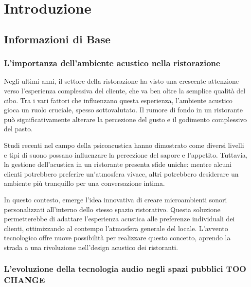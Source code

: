 
%

\chapter{Introduzione}
\label{cha:introduzione}


\section{Informazioni di Base}

\subsection{L'importanza dell'ambiente acustico nella ristorazione}
\noindent

Negli ultimi anni, il settore della ristorazione ha visto una crescente attenzione verso l'esperienza complessiva del cliente, che va ben oltre la semplice qualità del cibo. Tra i vari fattori che influenzano questa esperienza, l'ambiente acustico gioca un ruolo cruciale, spesso sottovalutato. Il rumore di fondo in un ristorante può significativamente alterare la percezione del gusto e il godimento complessivo del pasto.

Studi recenti nel campo della psicoacustica hanno dimostrato come diversi livelli e tipi di suono possano influenzare la percezione del sapore e l'appetito. Tuttavia, la gestione dell'acustica in un ristorante presenta sfide uniche: mentre alcuni clienti potrebbero preferire un'atmosfera vivace, altri potrebbero desiderare un ambiente più tranquillo per una conversazione intima.

In questo contesto, emerge l'idea innovativa di creare microambienti sonori personalizzati all'interno dello stesso spazio ristorativo. Questa soluzione permetterebbe di adattare l'esperienza acustica alle preferenze individuali dei clienti, ottimizzando al contempo l'atmosfera generale del locale. L'avvento tecnologico offre nuove possibilità per realizzare questo concetto, aprendo la strada a una rivoluzione nell'design acustico dei ristoranti.

\subsection{L'evoluzione della tecnologia audio negli spazi pubblici TOO CHANGE}
\noindent

